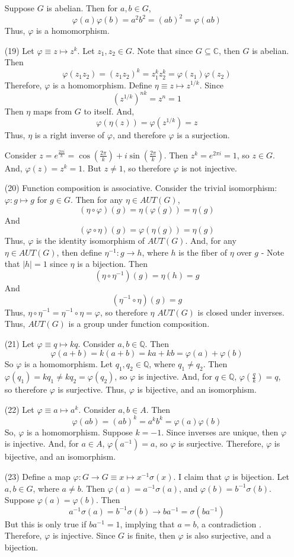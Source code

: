 \documentclass[12pt]{article}
\begin{document}
\begin{itemize}
Suppose $G$ is abelian. Then for $a, b \in G$,
$$\varphi(a)\varphi(b) = a^2b^2 = (ab)^2 = \varphi(ab)$$
Thus, $\varphi$ is a homomorphism.
\item[(19)]
Let $\varphi \equiv z \mapsto z^k$. Let $z_1, z_2 \in G$. Note that since $G \subseteq \mathbb{C}$, then $G$ is abelian. Then
$$\varphi(z_1z_2) = (z_1z_2)^k = z_1^kz_2^k = \varphi(z_1)\varphi(z_2)$$
Therefore, $\varphi$ is a homomorphism. Define $\eta \equiv z \mapsto z^{1/k}$. Since
$$(z^{1/k})^{nk} = z^{n} = 1$$
Then $\eta$ maps from $G$ to itself. And,
$$\varphi(\eta(z)) = \varphi(z^{1/k}) = z$$
Thus, $\eta$ is a right inverse of $\varphi$, and therefore $\varphi$ is a surjection.

Consider $z = e^{\frac{2\pi i}{k}} = \cos\left(\frac{2\pi}{k}\right) + i\sin\left(\frac{2\pi}{k}\right)$. Then $z^k = e^{2\pi i} = 1$, so $z \in G$. And, $\varphi(z) = z^k = 1$. But $z \neq 1$, so therefore $\varphi$ is not injective.
\item[(20)]
Function composition is associative. Consider the trivial isomorphism: $\varphi: g \mapsto g$ for $g \in G$. Then for any $\eta \in AUT(G)$,
$$(\eta \circ \varphi)(g) = \eta(\varphi(g)) = \eta(g)$$
And
$$(\varphi \circ \eta)(g) = \varphi(\eta(g)) = \eta(g)$$
Thus, $\varphi$ is the identity isomorphism of $AUT(G)$. And, for any $\eta \in AUT(G)$, then define $\eta^{-1}: g \rightarrow h$, where $h$ is the fiber of $\eta$ over $g$ - Note that $|h| = 1$ since $\eta$ is a bijection. Then
$$(\eta \circ \eta^{-1})(g) = \eta(h) = g$$
And
$$(\eta^{-1} \circ \eta)(g) = g$$
Thus, $\eta \circ \eta^{-1} = \eta^{-1} \circ \eta = \varphi$, so therefore $\eta$ $AUT(G)$ is closed under inverses. Thus, $AUT(G)$ is a group under function composition.
\item[(21)]
Let $\varphi \equiv q \mapsto kq$. Consider $a, b \in \mathbb{Q}$. Then
$$\varphi(a + b) = k(a + b) = ka + kb = \varphi(a) + \varphi(b)$$
So $\varphi$ is a homomorphism. Let $q_1, q_2 \in \mathbb{Q}$, where $q_1 \neq q_2$. Then $\varphi(q_1) = kq_1 \neq kq_2 = \varphi(q_2)$, so $\varphi$ is injective. And, for $q \in \mathbb{Q}$, $\varphi(\frac{q}{k}) = q$, so therefore $\varphi$ is surjective. Thus, $\varphi$ is bijective, and an isomorphism.
\item[(22)]
Let $\varphi \equiv a \mapsto a^k$. Consider $a, b \in A$. Then
$$\varphi(ab) = (ab)^k = a^kb^k = \varphi(a)\varphi(b)$$
So, $\varphi$ is a homomorphism. Suppose $k = -1$. Since inverses are unique, then $\varphi$ is injective. And, for $a \in A$, $\varphi(a^{-1}) = a$, so $\varphi$ is surjective. Therefore, $\varphi$ is bijective, and an isomorphism.
\item[(23)]
Define a map $\varphi: G \rightarrow G \equiv x \mapsto x^{-1}\sigma(x)$. I claim that $\varphi$ is bijection. Let $a, b \in G$, where $a \neq b$. Then $\varphi(a) = a^{-1}\sigma(a)$, and $\varphi(b) = b^{-1}\sigma(b)$. Suppose $\varphi(a) = \varphi(b)$. Then 
$$a^{-1}\sigma(a) = b^{-1}\sigma(b) \rightarrow ba^{-1} = \sigma(ba^{-1})$$
But this is only true if $ba^{-1} = 1$, implying that $a = b$, a contradiction . Therefore, $\varphi$ is injective. Since $G$ is finite, then $\varphi$ is also surjective, and a bijection.


\end{itemize}
\end{document}
